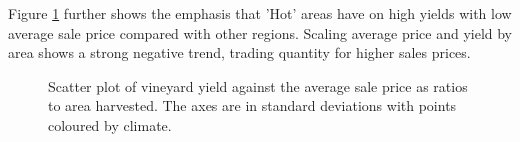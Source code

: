 \documentclass[review,12pt,authoryear]{elsarticle}
\begin{document}
\begin{linenumbers}
Figure \ref{fig:yield_vs_value_area} further shows the emphasis that 'Hot' areas have on high yields with low average sale price compared with other regions. Scaling average price and yield by area shows a strong negative trend, trading quantity for higher sales prices.
\par
\begin{figure}
    \caption{Scatter plot of vineyard yield against the average sale price as ratios to area harvested. The axes are in standard deviations with points coloured by climate.}\label{fig:yield_vs_value_area}
\end{figure}


\end{linenumbers}
\end{document}
